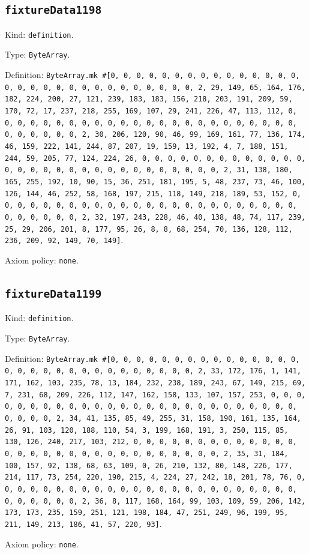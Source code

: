 \documentclass[11pt]{article}
\begin{document}
\subsection*{\texttt{fixtureData1198}}
\noindent Kind: \texttt{definition}.\par
\noindent Type: \texttt{ByteArray}.\par
\noindent Definition: \texttt{ByteArray.mk \#[0, 0, 0, 0, 0, 0, 0, 0, 0, 0, 0, 0, 0, 0, 0, 0, 0, 0, 0, 0, 0, 0, 0, 0, 0, 0, 0, 0, 0, 0, 2, 29, 149, 65, 164, 176, 182, 224, 200, 27, 121, 239, 183, 183, 156, 218, 203, 191, 209, 59, 170, 72, 17, 237, 218, 255, 169, 107, 29, 241, 226, 47, 113, 112, 0, 0, 0, 0, 0, 0, 0, 0, 0, 0, 0, 0, 0, 0, 0, 0, 0, 0, 0, 0, 0, 0, 0, 0, 0, 0, 0, 0, 0, 0, 2, 30, 206, 120, 90, 46, 99, 169, 161, 77, 136, 174, 46, 159, 222, 141, 244, 87, 207, 19, 159, 13, 192, 4, 7, 188, 151, 244, 59, 205, 77, 124, 224, 26, 0, 0, 0, 0, 0, 0, 0, 0, 0, 0, 0, 0, 0, 0, 0, 0, 0, 0, 0, 0, 0, 0, 0, 0, 0, 0, 0, 0, 0, 0, 2, 31, 138, 180, 165, 255, 192, 10, 90, 15, 36, 251, 181, 195, 5, 48, 237, 73, 46, 100, 126, 144, 46, 252, 58, 168, 197, 215, 118, 149, 218, 189, 53, 152, 0, 0, 0, 0, 0, 0, 0, 0, 0, 0, 0, 0, 0, 0, 0, 0, 0, 0, 0, 0, 0, 0, 0, 0, 0, 0, 0, 0, 0, 0, 2, 32, 197, 243, 228, 46, 40, 138, 48, 74, 117, 239, 25, 29, 206, 201, 8, 177, 95, 26, 8, 8, 68, 254, 70, 136, 128, 112, 236, 209, 92, 149, 70, 149]}.\par
\noindent Axiom policy: \texttt{none}.\par
\subsection*{\texttt{fixtureData1199}}
\noindent Kind: \texttt{definition}.\par
\noindent Type: \texttt{ByteArray}.\par
\noindent Definition: \texttt{ByteArray.mk \#[0, 0, 0, 0, 0, 0, 0, 0, 0, 0, 0, 0, 0, 0, 0, 0, 0, 0, 0, 0, 0, 0, 0, 0, 0, 0, 0, 0, 0, 0, 2, 33, 172, 176, 1, 141, 171, 162, 103, 235, 78, 13, 184, 232, 238, 189, 243, 67, 149, 215, 69, 7, 231, 68, 209, 226, 112, 147, 162, 158, 133, 107, 157, 253, 0, 0, 0, 0, 0, 0, 0, 0, 0, 0, 0, 0, 0, 0, 0, 0, 0, 0, 0, 0, 0, 0, 0, 0, 0, 0, 0, 0, 0, 0, 2, 34, 41, 135, 85, 49, 255, 31, 158, 190, 161, 135, 164, 26, 91, 103, 120, 188, 110, 54, 3, 199, 168, 191, 3, 250, 115, 85, 130, 126, 240, 217, 103, 212, 0, 0, 0, 0, 0, 0, 0, 0, 0, 0, 0, 0, 0, 0, 0, 0, 0, 0, 0, 0, 0, 0, 0, 0, 0, 0, 0, 0, 0, 0, 2, 35, 31, 184, 100, 157, 92, 138, 68, 63, 109, 0, 26, 210, 132, 80, 148, 226, 177, 214, 117, 73, 254, 220, 190, 215, 4, 224, 27, 242, 18, 201, 78, 76, 0, 0, 0, 0, 0, 0, 0, 0, 0, 0, 0, 0, 0, 0, 0, 0, 0, 0, 0, 0, 0, 0, 0, 0, 0, 0, 0, 0, 0, 0, 2, 36, 8, 117, 168, 164, 99, 103, 109, 59, 206, 142, 173, 173, 235, 159, 251, 121, 198, 184, 47, 251, 249, 96, 199, 95, 211, 149, 213, 186, 41, 57, 220, 93]}.\par
\noindent Axiom policy: \texttt{none}.\par
\end{document}
